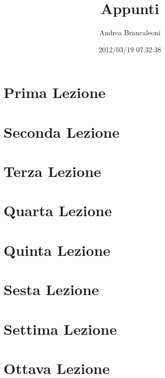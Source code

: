 \documentclass[a4paper]{book}
\author{Andrea Brancaleoni}
\title{Appunti}
\date{2012/03/19 07:32:38}
\begin{document}
  \maketitle

  \chapter{Prima Lezione}
    
  \chapter{Seconda Lezione}
    
  \chapter{Terza Lezione}
    
  \chapter{Quarta Lezione}
    
  \chapter{Quinta Lezione}
    
  \chapter{Sesta Lezione}
    
  \chapter{Settima Lezione}
    
  \chapter{Ottava Lezione}
    
\end{document}
